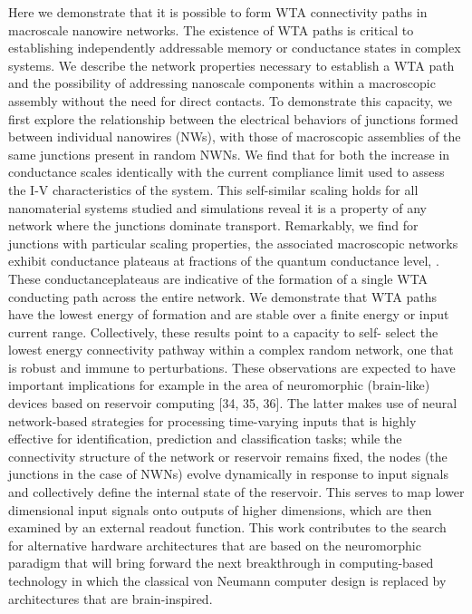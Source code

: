 Here we demonstrate that it is possible to form WTA connectivity paths in macroscale nanowire networks. The existence of WTA paths is critical to establishing independently addressable memory or conductance states in complex systems. We describe the network properties necessary to establish a WTA path and the possibility of addressing nanoscale components within a macroscopic assembly without the need for direct contacts. To demonstrate this capacity, we first explore the relationship between the electrical behaviors of junctions formed between individual nanowires (NWs), with those of macroscopic assemblies of the same junctions present in  random NWNs. We find that for both the increase in conductance scales identically with the current compliance limit used to assess the I-V characteristics of the system. This self-similar scaling holds for all nanomaterial systems studied and simulations reveal it is a property of any network where the junctions dominate transport. Remarkably, we find for junctions with particular scaling properties, the associated macroscopic networks exhibit conductance plateaus at fractions of the quantum conductance level, . These conductanceplateaus are indicative of the formation of a single WTA conducting path across the entire network. We demonstrate that WTA paths have the lowest energy of formation and are stable over a finite energy or input current range. Collectively, these results point to a capacity to self- select the lowest energy connectivity pathway within a complex random network, one that is robust and immune to perturbations. These observations are expected to have important implications for example in the area of neuromorphic (brain-like) devices based on reservoir computing [34, 35, 36]. The latter makes use of neural network-based strategies for processing time-varying inputs that is highly effective for identification, prediction and classification tasks; while the connectivity structure of the network or reservoir remains fixed, the nodes (the junctions in the case of NWNs) evolve dynamically in response to input signals and collectively define the internal state of the reservoir. This serves to map lower dimensional input signals onto outputs of higher dimensions, which are then examined by an external readout function. This work contributes to the search for alternative hardware architectures that are based on the neuromorphic paradigm that will bring forward the next breakthrough in computing-based  technology in which the classical von Neumann computer design is replaced by architectures that are brain-inspired.
